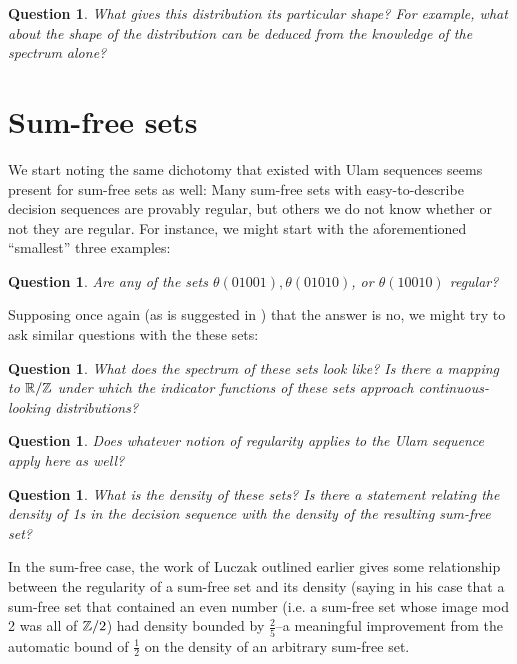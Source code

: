 \documentclass{report}
\newtheorem{question}[theorem]{Question}
\theoremstyle{remark}
\numberwithin{equation}{section}
\begin{document}
\begin{question}\label{qn:shape}
  What gives this distribution its particular shape?  For example,
  what about the shape of the distribution can be deduced from the
  knowledge of the spectrum alone?
\end{question}

\section{Sum-free sets}

We start noting the same dichotomy that existed with Ulam sequences
seems present for sum-free sets as well: Many sum-free sets with
easy-to-describe decision sequences are provably regular, but others
we do not know whether or not they are regular.  For instance, we
might start with the aforementioned ``smallest'' three examples:

\begin{question}\label{qn:sumfree_regularity}
  Are any of the sets $\theta(01001), \theta(01010)$, or
  $\theta(10010)$ regular?
\end{question}

Supposing once again (as is suggested in
\cite{calkin:int2005}) that the answer is no, we might try
to ask similar questions with the these sets:

\begin{question}\label{qn:sumfree_spectrum}
  What does the spectrum of these sets look like?  Is there a mapping
  to $\mathbb{R}/\mathbb{Z}$ under which the indicator functions of these sets
  approach continuous-looking distributions?
\end{question}

\begin{question}\label{qn:sumfree_new_regularity}
  Does whatever notion of regularity applies to the Ulam sequence
  apply here as well?
\end{question}

\begin{question}\label{qn:sumfree_density}
  What is the density of these sets?  Is there a statement relating
  the density of 1s in the decision sequence with the density of the
  resulting sum-free set?
\end{question}

In the sum-free case, the work of Luczak outlined earlier gives some
relationship between the regularity of a sum-free set and its density
(saying in his case that a sum-free set that contained an even number
(i.e. a sum-free set whose image mod 2 was all of $\mathbb{Z}/2$) had density
bounded by $\frac25$--a meaningful improvement from the automatic
bound of $\frac12$ on the density of an arbitrary sum-free set.
\end{document}
